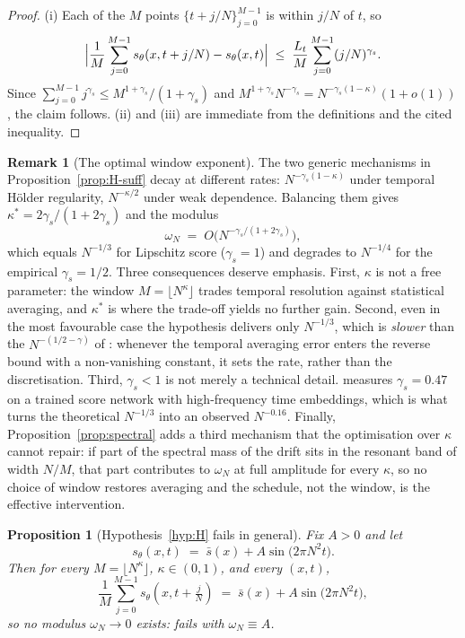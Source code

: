 \documentclass[a4paper,fleqn]{cas-dc}
\newtheorem{proposition}[theorem]{Proposition}
\theoremstyle{definition}
\newtheorem{remark}[theorem]{Remark}
\begin{document}
\begin{proof}
(i) Each of the $M$ points $\{t+j/N\}_{j=0}^{M-1}$ is within $j/N$ of $t$, so
\[
\Bigl\lvert\frac1M\sum_{j=0}^{M-1}s_{\theta}(x,t+j/N)-s_{\theta}(x,t)\Bigr\rvert
\;\le\;\frac{L_{t}}{M}\sum_{j=0}^{M-1}(j/N)^{\gamma_{s}} .
\]
Since
$\sum_{j=0}^{M-1}j^{\gamma_{s}}\le M^{1+\gamma_{s}}/(1+\gamma_{s})$ and
$M^{1+\gamma_{s}}N^{-\gamma_{s}}=N^{-\gamma_{s}(1-\kappa)}(1+o(1))$, the claim
follows.
(ii) and (iii) are immediate from the definitions and the cited inequality.
\end{proof}

\begin{remark}[The optimal window exponent]
\label{rem:kappa}
The two generic mechanisms in Proposition~\ref{prop:H-suff} decay at different rates:
$N^{-\gamma_{s}(1-\kappa)}$ under temporal H\"older regularity, $N^{-\kappa/2}$
under weak dependence. Balancing them gives
$\kappa^{*}=2\gamma_{s}/(1+2\gamma_{s})$ and the modulus
\begin{equation}
\omega_{N}\;=\;O\bigl(N^{-\gamma_{s}/(1+2\gamma_{s})}\bigr),
\label{eq:kappa-star}
\end{equation}
which equals $N^{-1/3}$ for Lipschitz score ($\gamma_{s}=1$) and degrades to
$N^{-1/4}$ for the empirical $\gamma_{s}=1/2$. Three consequences deserve
emphasis. First, $\kappa$ is not a free parameter: the window
$M=\lfloor N^{\kappa}\rfloor$ trades temporal resolution against statistical
averaging, and $\kappa^{*}$ is where the trade-off yields no further gain. Second, even in the
most favourable case the hypothesis delivers only $N^{-1/3}$, which is
\emph{slower} than the $N^{-(1/2-\gamma)}$ of : whenever the
temporal averaging error enters the reverse bound with a non-vanishing constant,
it sets the rate, rather than the discretisation. Third, $\gamma_{s}<1$ is not merely a technical detail.  measures $\gamma_{s}=0.47$ on a trained score
network with high-frequency time embeddings, which is what turns the theoretical
$N^{-1/3}$ into an observed $N^{-0.16}$. Finally, Proposition~\ref{prop:spectral} adds a third
mechanism that the optimisation over $\kappa$ cannot repair: if part of the spectral
mass of the drift sits in the resonant band of width $N/M$, that part contributes to
$\omega_{N}$ at full amplitude for every $\kappa$, so no choice of window restores
averaging and the schedule, not the window, is the effective intervention.
\end{remark}

\begin{proposition}[Hypothesis~\ref{hyp:H} fails in general]
\label{prop:H-fail}
Fix $A>0$ and let
\begin{equation}
s_{\theta}(x,t)\;=\;\bar s(x)+A\sin\!\bigl(2\pi N^{2}t\bigr).
\label{eq:aliasing}
\end{equation}
Then for every $M=\lfloor N^{\kappa}\rfloor$, $\kappa\in(0,1)$, and every $(x,t)$,
\begin{equation}
\frac{1}{M}\sum_{j=0}^{M-1}s_{\theta}\!\left(x,t+\tfrac{j}{N}\right)
\;=\;\bar s(x)+A\sin\!\bigl(2\pi N^{2}t\bigr),
\end{equation}
so no modulus $\omega_{N}\to0$ exists:  fails with
$\omega_{N}\equiv A$.
\end{proposition}
\end{document}
